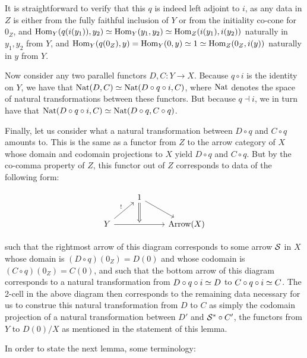 \documentclass[./main.tex]{subfiles}
\begin{document}
\begin{proofEnd}
It is straightforward to verify that this $q$ is indeed left adjoint to $i$, as any data in $Z$ is either from the fully faithful inclusion of $Y$ or from the initiality co-cone for $0_Z$, and $\operatorname{Hom}_Y(q(i(y_1)), y_2) \simeq \operatorname{Hom}_Y(y_1, y_2) \simeq \operatorname{Hom}_Z(i(y_1), i(y_2))$ naturally in $y_1, y_2$ from $Y$, and $\operatorname{Hom}_Y(q(0_Z), y) = \operatorname{Hom}_Y(0, y) \simeq 1 \simeq \operatorname{Hom}_Z(0_Z, i(y))$ naturally in $y$ from $Y$.

Now consider any two parallel functors $D, C : Y \to X$. Because $q \circ i$ is the identity on $Y$, we have that $\operatorname{Nat}(D, C) \simeq \operatorname{Nat}(D \circ q \circ i, C)$, where $\operatorname{Nat}$ denotes the space of natural transformations between these functors. But because $q \dashv i$, we in turn have that $\operatorname{Nat}(D \circ q \circ i, C) \simeq \operatorname{Nat}(D \circ q, C \circ q)$.

Finally, let us consider what a natural transformation between $D \circ q$ and $C \circ q$ amounts to. This is the same as a functor from $Z$ to the arrow category of $X$ whose domain and codomain projections to $X$ yield $D \circ q$ and $C \circ q$. But by the co-comma property of $Z$, this functor out of $Z$ corresponds to data of the following form:

\[\begin{tikzcd}
	& 1 \\
	Y && {\arrowcat{X}}
	\arrow["\unique", from=2-1, to=1-2]
	\arrow[from=1-2, to=2-3]
	\arrow[""{name=0, anchor=center}, from=2-1, to=2-3]
	\arrow[Rightarrow, from=1-2, to=0]
\end{tikzcd}\]

such that the rightmost arrow of this diagram corresponds to some arrow $\mathcal{S}$ in $X$ whose domain is $(D \circ q)(0_Z) = D(0)$ and whose codomain is $(C \circ q)(0_Z) = C(0)$, and such that the bottom arrow of this diagram corresponds to a natural transformation from $D \circ q \circ i \simeq D$ to $C \circ q \circ i \simeq C$. The 2-cell in the above diagram then corresponds to the remaining data necessary for us to construe this natural transformation from $D$ to $C$ as simply the codomain projection of a natural transformation between $D'$ and $\mathcal{S}^{*} \circ C'$, the functors from $Y$ to $D(0)/X$ as mentioned in the statement of this lemma.

\end{proofEnd}

In order to state the next lemma, some terminology:
\end{document}
